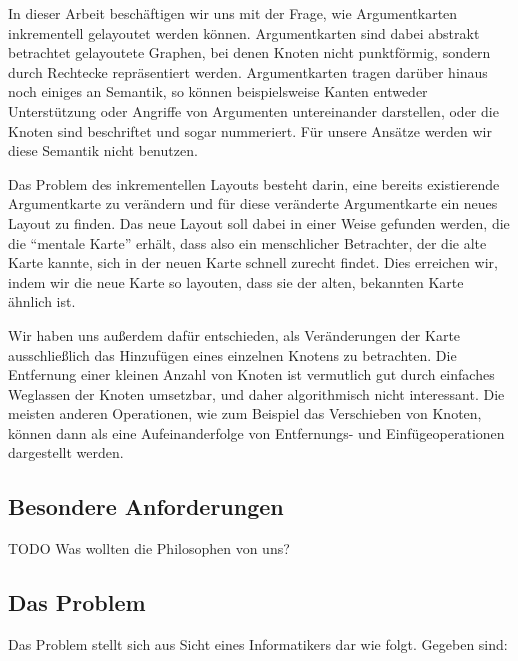 \label{sub:intro}

In dieser Arbeit beschäftigen wir uns mit der Frage, wie Argumentkarten inkrementell gelayoutet werden können. Argumentkarten sind dabei abstrakt betrachtet gelayoutete Graphen, bei denen Knoten nicht punktförmig, sondern durch Rechtecke repräsentiert werden. Argumentkarten tragen darüber hinaus noch einiges an Semantik, so können beispielsweise Kanten entweder Unterstützung oder Angriffe von Argumenten untereinander darstellen, oder die Knoten sind beschriftet und sogar nummeriert. Für unsere Ansätze werden wir diese Semantik nicht benutzen.

Das Problem des inkrementellen Layouts besteht darin, eine bereits existierende Argumentkarte zu verändern und für diese veränderte Argumentkarte ein neues Layout zu finden. Das neue Layout soll dabei in einer Weise gefunden werden, die die "`mentale Karte"' erhält, dass also ein menschlicher Betrachter, der die alte Karte kannte, sich in der neuen Karte schnell zurecht findet. Dies erreichen wir, indem wir die neue Karte so layouten, dass sie der alten, bekannten Karte ähnlich ist.

Wir haben uns außerdem dafür entschieden, als Veränderungen der Karte ausschließlich das Hinzufügen eines einzelnen Knotens zu betrachten. Die Entfernung einer kleinen Anzahl von Knoten ist vermutlich gut durch einfaches Weglassen der Knoten umsetzbar, und daher algorithmisch nicht interessant. Die meisten anderen Operationen, wie zum Beispiel das Verschieben von Knoten, können dann als eine Aufeinanderfolge von Entfernungs- und Einfügeoperationen dargestellt werden.

\subsection{Besondere Anforderungen}
\label{sub:tasks}

TODO Was wollten die Philosophen von uns?

\subsection{Das Problem}
\label{sub:problem}

Das Problem stellt sich aus Sicht eines Informatikers dar wie folgt. Gegeben sind:

